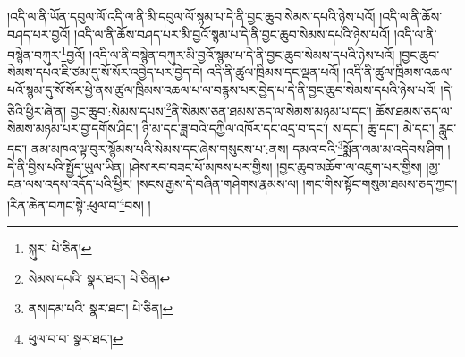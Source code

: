 །འདི་ལ་ནི་ཡོན་དབུལ་ལོ་འདི་ལ་ནི་མི་དབུལ་ལོ་སྙམ་པ་དེ་ནི་བྱང་ཆུབ་སེམས་དཔའི་ཉེས་པའོ། །འདི་ལ་ནི་ཆོས་བཤད་པར་བྱའོ། །འདི་ལ་ནི་ཆོས་བཤད་པར་མི་བྱའོ་སྙམ་པ་དེ་ནི་བྱང་ཆུབ་སེམས་དཔའི་ཉེས་པའོ། །འདི་ལ་ནི་བསྙེན་བཀུར་\footnote{སྐུར་  པེ་ཅིན། }བྱའོ། །འདི་ལ་ནི་བསྙེན་བཀུར་མི་བྱའོ་སྙམ་པ་དེ་ནི་བྱང་ཆུབ་སེམས་དཔའི་ཉེས་པའོ། །བྱང་ཆུབ་སེམས་དཔའ་ཇི་ཙམ་དུ་སོ་སོར་འབྱེད་པར་བྱེད་དེ། འདི་ནི་ཚུལ་ཁྲིམས་དང་ལྡན་པའོ། །འདི་ནི་ཚུལ་ཁྲིམས་འཆལ་པའོ་སྙམ་དུ་སོ་སོར་ཕྱེ་ནས་ཚུལ་ཁྲིམས་འཆལ་པ་ལ་བརྙས་པར་བྱེད་པ་དེ་ནི་བྱང་ཆུབ་སེམས་དཔའི་ཉེས་པའོ། །དེ་ཅིའི་ཕྱིར་ཞེ་ན། བྱང་ཆུབ་:སེམས་དཔས་\footnote{སེམས་དཔའི་  སྣར་ཐང་།  པེ་ཅིན། }ནི་སེམས་ཅན་ཐམས་ཅད་ལ་སེམས་མཉམ་པ་དང་། ཆོས་ཐམས་ཅད་ལ་སེམས་མཉམ་པར་བྱ་དགོས་ཤིང་། ཉི་མ་དང་ཟླ་བའི་དཀྱིལ་འཁོར་དང་འདྲ་བ་དང་། ས་དང་། ཆུ་དང་། མེ་དང་། རླུང་དང་། ནམ་མཁའ་ལྟ་བུར་སྙོམས་པའི་སེམས་དང་ཞེས་གསུངས་པ་:ནས། དམའ་བའི་\footnote{ནས།དམ་པའི་  སྣར་ཐང་།  པེ་ཅིན། }སྨོན་ལམ་མ་འདེབས་ཤིག །དེ་ནི་བྱིས་པའི་སྤྱོད་ཡུལ་ཡིན། །ཤེས་རབ་བཟང་པོ་མཁས་པར་གྱིས། །བྱང་ཆུབ་མཆོག་ལ་འཇུག་པར་གྱིས། །མྱ་ངན་ལས་འདས་འདོད་པའི་ཕྱིར། །སངས་རྒྱས་དེ་བཞིན་གཤེགས་རྣམས་ལ། །གང་གིས་སྟོང་གསུམ་ཐམས་ཅད་ཀྱང་། །རིན་ཆེན་བཀང་སྟེ་:ཕུལ་བ་\footnote{ཕུལ་བ་བ་  སྣར་ཐང་། }བས། །
